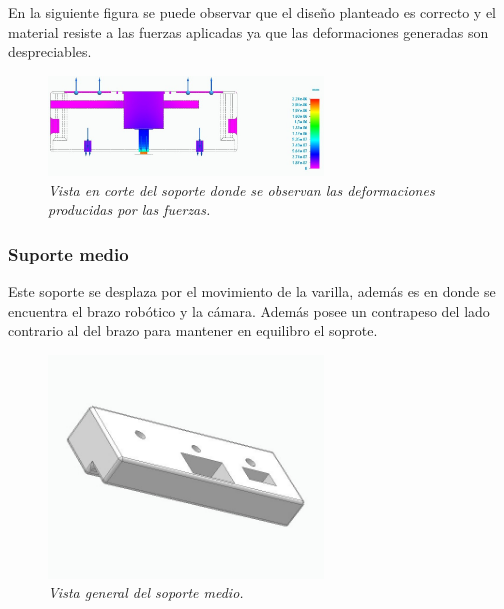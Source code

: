 En la siguiente figura se puede observar que el diseño planteado es correcto y el material resiste a las fuerzas aplicadas ya que las deformaciones generadas son despreciables.
\begin{figure}[H]
    \centering
        \includegraphics[width=0.65\textwidth]{img/SuperiorReal_simplificado_tensiones.jpg}
        \caption{\textit{Vista en corte del soporte donde se observan las deformaciones producidas por las fuerzas.}}
        \label{fig:SuperiorReal_simplificado_tensiones}
\end{figure}

\subsubsection{Suporte medio}
Este soporte se desplaza por el movimiento de la varilla, además es en donde se encuentra el brazo robótico y la cámara. Además posee un contrapeso del lado contrario al del brazo para mantener en equilibro el soprote.
\begin{figure}[H]
    \centering
\includegraphics[width=0.65\textwidth]{img/MedioReal_simplificado_vista.jpg} \par
    \caption{\textit{Vista general del soporte medio.}}
    \label{fig:soporte_medio_Real}
\end{figure}

